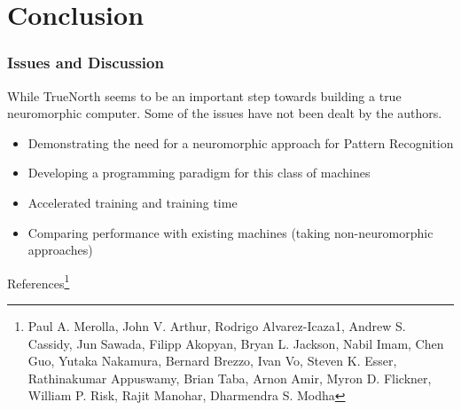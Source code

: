 \documentclass{beamer}
\begin{document}
\section{Conclusion}

\begin{frame}
\frametitle{Issues and Discussion}
While TrueNorth seems to be an important step towards building a true neuromorphic computer. Some of the issues have not been dealt by the authors.
\begin{itemize}
\item Demonstrating the need for a neuromorphic approach for Pattern Recognition
\item Developing a programming paradigm for this class of machines
\item Accelerated training and training time
\item Comparing performance with existing machines (taking non-neuromorphic approaches)
\end{itemize}
References\footnote{Paul A. Merolla, John V. Arthur, Rodrigo Alvarez-Icaza1, Andrew S. Cassidy, Jun Sawada, Filipp Akopyan, Bryan L. Jackson, Nabil Imam, Chen Guo, Yutaka Nakamura, Bernard Brezzo, Ivan Vo, Steven K. Esser, Rathinakumar Appuswamy, Brian Taba, Arnon Amir, Myron D. Flickner, William P. Risk, Rajit Manohar, Dharmendra S. Modha}
\end{frame}
\end{document}
